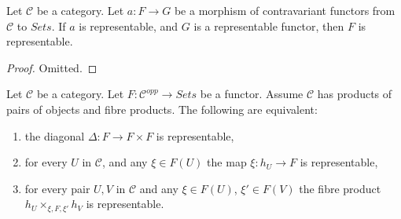 \begin{lemma}
\label{lemma-representable-over-representable}
Let $\mathcal{C}$ be a category.
Let $a : F \to G$ be a morphism of contravariant functors
from $\mathcal{C}$ to $\textit{Sets}$. If $a$ is representable,
and $G$ is a representable functor, then $F$ is representable.
\end{lemma}

\begin{proof}
Omitted.
\end{proof}

\begin{lemma}
\label{lemma-representable-diagonal}
Let $\mathcal{C}$ be a category.
Let $F : \mathcal{C}^{opp} \to \textit{Sets}$ be a functor.
Assume $\mathcal{C}$ has products of pairs of objects and fibre products.
The following are equivalent:
\begin{enumerate}
\item the diagonal $\Delta : F \to F \times F$ is representable,
\item for every $U$ in $\mathcal{C}$,
and any $\xi \in F(U)$ the map $\xi : h_U \to F$ is representable,
\item for every pair $U, V$ in $\mathcal{C}$
and any $\xi \in F(U)$, $\xi' \in F(V)$ the fibre product
$h_U \times_{\xi, F, \xi'} h_V$ is representable.
\end{enumerate}
\end{lemma}

